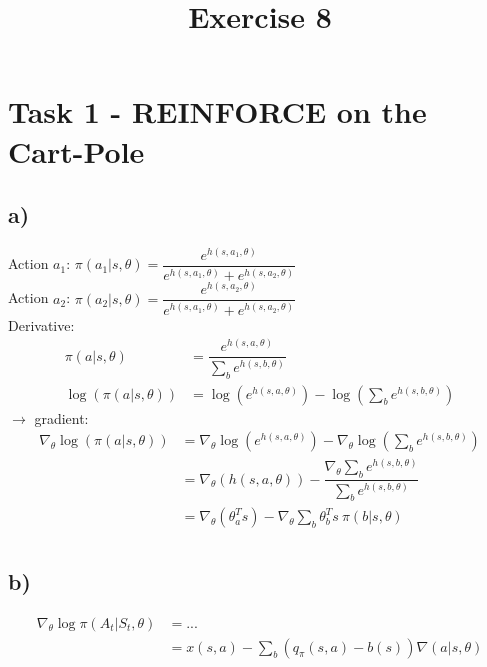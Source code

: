 \documentclass[a4paper]{article}
\date{}
\author{}
\title{\textbf{Exercise 8}}
\begin{document}
\maketitle 
\thispagestyle{fancy}

\section*{Task 1 - REINFORCE on the Cart-Pole}

\subsection*{a)}
Action $a_1$: $\pi (a_1 | s, \theta) = \dfrac{e^{h(s, a_1, \theta)}}{e^{h(s, a_1, \theta)} + e^{h(s, a_2, \theta)}}$ \\ \linebreak
Action $a_2$: $\pi (a_2 | s, \theta) = \dfrac{e^{h(s, a_2, \theta)}}{e^{h(s, a_1, \theta)} + e^{h(s, a_2, \theta)}}$ \\ \linebreak
Derivative: 
\begin{align*}
\pi(a|s, \theta) &= \dfrac{e^{h(s, a, \theta)}}{\sum_{b}e^{h(s, b, \theta)}} \\
\log(\pi(a|s, \theta) ) &= \log(e^{h(s, a, \theta)}) - \log(\sum_{b}e^{h(s, b, \theta)}) 
\end{align*}
$\rightarrow$ gradient: 
\begin{align*}
	\nabla_{\theta} \log(\pi(a|s, \theta) ) &= \nabla_{\theta} \log(e^{h(s, a, \theta)}) - \nabla_{\theta} \log(\sum_{b}e^{h(s, b, \theta)}) \\
	&= \nabla_{\theta} (h(s, a, \theta)) - \dfrac{\nabla_{\theta} \sum_{b}e^{h(s,b,\theta)}}{ \sum_{b}e^{h(s,b,\theta)}}\\
	&= \nabla_{\theta} (\theta^T_a s) - \nabla_{\theta} \sum_{b} \theta^T_b s \ \pi(b|s, \theta) \\
\end{align*}
\subsection*{b)}
\begin{align*}
	\nabla_{\theta} \log \pi (A_t | S_t, \theta) &= ... \\
	 &= x(s, a) - \sum_{b}^{}(q_{\pi}(s, a) - b(s)) \nabla(a|s, \theta)
\end{align*}
\end{document}
